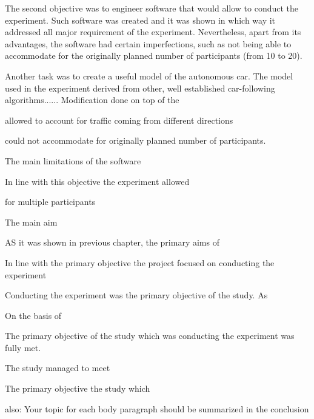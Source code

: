 \documentclass[11pt,english]{article}
\begin{document}
\par

The second objective was to engineer software that would allow to conduct the experiment. Such software was created and it was shown in which way it addressed all major requirement of the experiment. Nevertheless, apart from its advantages, the software had certain imperfections, such as not being able to accommodate for the originally planned number of participants (from 10 to 20).


\par

Another task was to create a useful model of the autonomous car. The model used in the experiment derived from other, well established car-following algorithms...... Modification done on top of the 
 


allowed to account for traffic coming from different directions




could not accommodate for originally planned number of participants.

The main limitations of the software 




In line with this objective the experiment allowed 

for multiple participants





The main  aim 



AS it was shown in previous chapter, the primary aims of 






In line with the primary objective  the project focused on  conducting the experiment


Conducting the experiment was the primary objective of the study. As 


On the basis of 




The primary objective of the study  which was conducting the experiment was fully met. 



The study managed to meet 


The primary objective the study which 




also:
Your topic for each body paragraph should be summarized in the conclusion
\end{document}
